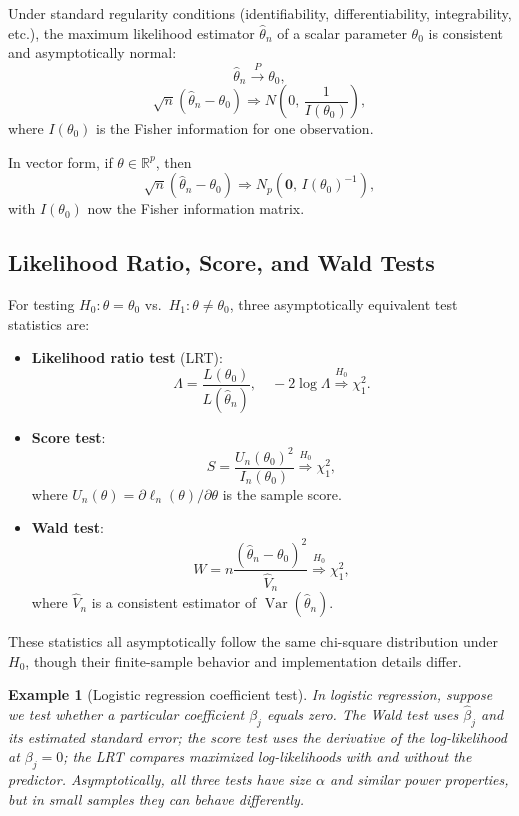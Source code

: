 \documentclass[11pt,a4paper]{article}
\newtheorem{example}{Example}[section]
\numberwithin{equation}{section}
\begin{document}
Under standard regularity conditions (identifiability, differentiability, integrability, etc.), the maximum likelihood estimator $\hat{\theta}_n$ of a scalar parameter $\theta_0$ is consistent and asymptotically normal:
\[
\hat{\theta}_n \xrightarrow{P} \theta_0,
\]
\[
\sqrt{n}(\hat{\theta}_n - \theta_0)
\Rightarrow N\left(0,\,\frac{1}{I(\theta_0)}\right),
\]
where $I(\theta_0)$ is the Fisher information for one observation.

In vector form, if $\theta\in\mathbb{R}^p$, then
\[
\sqrt{n}(\hat{\theta}_n - \theta_0)
\Rightarrow N_p\left(\bm{0},\, I(\theta_0)^{-1}\right),
\]
with $I(\theta_0)$ now the Fisher information matrix.

\subsection{Likelihood Ratio, Score, and Wald Tests}

For testing $H_0:\theta=\theta_0$ vs.\ $H_1:\theta\ne\theta_0$, three asymptotically equivalent test statistics are:

\begin{itemize}
    \item \textbf{Likelihood ratio test} (LRT):
    \[
    \Lambda = \frac{L(\theta_0)}{L(\hat{\theta}_n)},\quad
    -2\log\Lambda
    \overset{H_0}{\Rightarrow} \chi^2_1.
    \]
    \item \textbf{Score test}:
    \[
    S = \frac{U_n(\theta_0)^2}{I_n(\theta_0)}
    \overset{H_0}{\Rightarrow} \chi^2_1,
    \]
    where $U_n(\theta)=\partial \ell_n(\theta)/\partial\theta$ is the sample score.
    \item \textbf{Wald test}:
    \[
    W = n\frac{(\hat{\theta}_n - \theta_0)^2}{\hat{V}_n}
    \overset{H_0}{\Rightarrow} \chi^2_1,
    \]
    where $\hat{V}_n$ is a consistent estimator of $\operatorname{Var}(\hat{\theta}_n)$.
\end{itemize}

These statistics all asymptotically follow the same chi-square distribution under $H_0$, though their finite-sample behavior and implementation details differ.

\begin{example}[Logistic regression coefficient test]
In logistic regression, suppose we test whether a particular coefficient $\beta_j$ equals zero. 
The Wald test uses $\hat{\beta}_j$ and its estimated standard error; the score test uses the derivative of the log-likelihood at $\beta_j=0$; the LRT compares maximized log-likelihoods with and without the predictor. 
Asymptotically, all three tests have size $\alpha$ and similar power properties, but in small samples they can behave differently.

\end{example}
\end{document}

